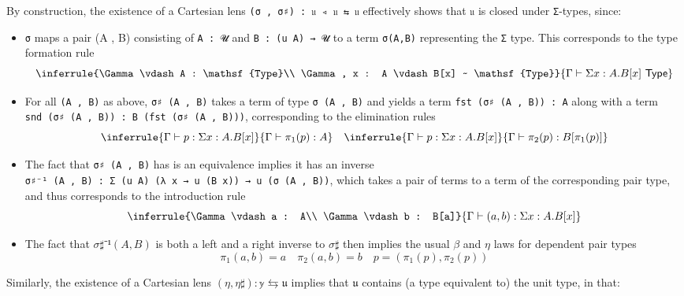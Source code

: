 \documentclass[
  11pt,
  oneside,
  article]{memoir}
\providecommand{\tightlist}{%
  \setlength{\itemsep}{0pt}\setlength{\parskip}{0pt}}
\theoremstyle{definition}
\theoremstyle{plain}
\newcommand{\0}{\textsf{0}}
\newcommand{\1}{\tn{\textsf{1}}}
\begin{document}
By construction, the existence of a Cartesian lens
\texttt{(σ\ ,\ σ♯)\ :\ 𝔲\ ◃\ 𝔲\ ⇆\ 𝔲} effectively shows that \texttt{𝔲}
is closed under \texttt{Σ}-types, since:

\begin{itemize}
\tightlist
\item
  \texttt{σ} maps a pair (A , B) consisting of \texttt{A\ :\ 𝓤} and
  \texttt{B\ :\ (u\ A)\ →\ 𝓤} to a term \texttt{σ(A,B)} representing the
  \texttt{Σ} type. This corresponds to the type formation rule
  \[ \inferrule{\Gamma \vdash A : \mathsf{Type}\\ \Gamma, x : A \vdash B[x] ~ \mathsf{Type}}{\Gamma \vdash \Sigma x : A . B[x] ~ \mathsf{Type}} \]
\item
  For all \texttt{(A\ ,\ B)} as above, \texttt{σ♯\ (A\ ,\ B)} takes a
  term of type \texttt{σ\ (A\ ,\ B)} and yields a term
  \texttt{fst\ (σ♯\ (A\ ,\ B))\ :\ A} along with a term
  \texttt{snd\ (σ♯\ (A\ ,\ B))\ :\ B\ (fst\ (σ♯\ (A\ ,\ B)))},
  corresponding to the elimination rules \[
  \inferrule{\Gamma \vdash p : \Sigma x : A . B[x]}{\Gamma \vdash \pi_1(p) : A} \quad \inferrule{\Gamma \vdash p : \Sigma x : A . B[x]}{\Gamma \vdash \pi_2(p) : B[\pi_1(p)]} \]
\item
  The fact that \texttt{σ♯\ (A\ ,\ B)} has is an equivalence implies it
  has an inverse
  \texttt{σ♯⁻¹\ (A\ ,\ B)\ :\ Σ\ (u\ A)\ (λ\ x\ →\ u\ (B\ x))\ →\ u\ (σ\ (A\ ,\ B))},
  which takes a pair of terms to a term of the corresponding pair type,
  and thus corresponds to the introduction rule
  \[ \inferrule{\Gamma \vdash a : A\\ \Gamma \vdash b : B[a]}{\Gamma \vdash (a , b) : \Sigma x : A . B[x]} \]
\item
  The fact that \(σ♯⁻¹ (A , B)\) is both a left and a right inverse to
  \(σ♯\) then implies the usual \(β\) and \(η\) laws for dependent pair
  types
  \[ \pi_1(a , b) = a \quad \pi_2(a , b) = b \quad p = (\pi_1(p) , \pi_2(p)) \]
\end{itemize}

Similarly, the existence of a Cartesian lens \((η , η♯) : 𝕪 ⇆ 𝔲\)
implies that \(𝔲\) contains (a type equivalent to) the unit type, in
that:
\end{document}
